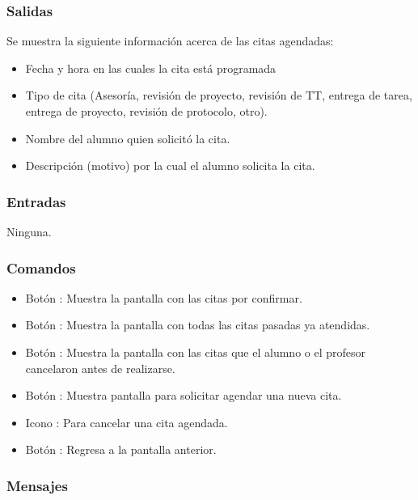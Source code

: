 \subsubsection{Salidas}
	\noindent
	Se muestra la siguiente información acerca de las citas agendadas:
		\begin{itemize}
			\item Fecha y hora en las cuales la cita está programada
			\item Tipo de cita (Asesoría, revisión de proyecto, revisión de TT, entrega de tarea, entrega de proyecto, revisión de protocolo, otro).
			\item Nombre del alumno quien solicitó la cita.
			\item Descripción (motivo) por la cual el alumno solicita la cita.
		\end{itemize}

\subsubsection{Entradas}
	\noindent
	Ninguna.

\subsubsection{Comandos}
	\begin{itemize}
		\item Botón : Muestra la pantalla con las citas por confirmar.
		\item Botón : Muestra la pantalla con todas las citas pasadas ya atendidas.
		\item Botón : Muestra la pantalla con las citas que el alumno o el profesor cancelaron antes de realizarse.
		\item Botón \IUbutton{ + }: Muestra pantalla para solicitar agendar una nueva cita.
		\item Icono : Para cancelar una cita agendada.
		\item Botón : Regresa a la pantalla anterior.
	\end{itemize}

\subsubsection{Mensajes}
	\begin{Citemize}
		\item {}
	\end{Citemize}

